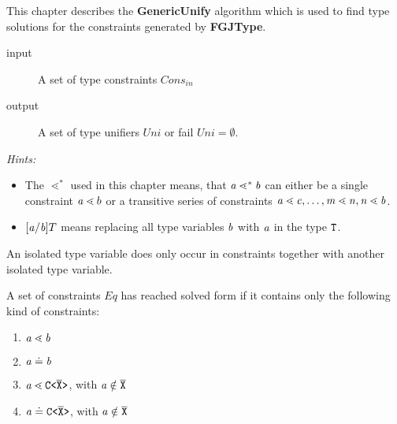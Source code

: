 \label{sec:unify}
This chapter describes the \textbf{GenericUnify} algorithm
which is used to find type solutions for the constraints generated by \textbf{FGJType}.

\begin{description}
\item[input] A set of type constraints $Cons_{in}$ %
\item[output] A set of type unifiers $Uni$
or fail $Uni = \emptyset$.
\end{description}

\textit{Hints:}
\begin{itemize}
\item The $\lessdot^*$ used in this chapter means,
that $\mathit{ a } \lessdot^* \mathit{ b }$ can either be a single constraint $\mathit{ a } \lessdot b$ or a transitive series of constraints
$\mathit{ a } \lessdot \mathit{ c }, \ldots, \mathit{ m } \lessdot \mathit{ n }, \mathit{ n } \lessdot \mathit{ b }$.
\item $[\mathit{ a }/\mathit{ b }]T$ means replacing all type variables $\mathit{ b }$ with $\mathit{ a }$ in the type $\texttt{T}$.
\end{itemize}
\begin{definition} \label{def:isolated-type-variable}
    \textrm
  An isolated type variable does only occur in constraints together with another isolated type variable.
  \end{definition}
  
  \begin{definition}\label{def:solved-form}
    \textrm
    A set of constraints $Eq$ has reached solved form if it contains only the following kind of constraints:
    \begin{enumerate}
      \item $\mathit{ a } \lessdot \mathit{ b }$ %
      \item $\mathit{ a } \doteq \mathit{ b }$
      \item $\mathit{ a } \lessdot \mathtt{C \texttt{<} \overline{\tt X} \texttt{>} }$, with $\mathit{ a } \notin \overline{\tt X}$ %
      \item $\mathit{ a } \doteq \mathtt{C \texttt{<} \overline{\tt X} \texttt{>} }$, with $\mathit{ a } \notin \overline{\tt X}$
    \end{enumerate}
  \end{definition}  

